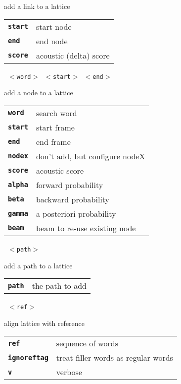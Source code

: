 \begin{description}
\begin{description}
        add a link to a lattice

      \begin{tabular}{ll}
 \texttt{\textbf{start}} &  start node  \\
 \texttt{\textbf{end}} &    end node  \\
 \texttt{\textbf{score}} &   acoustic (delta) score  \\
      \end{tabular}
       \texttt{ $<$word$>$ $<$start$>$ $<$end$>$      } \

        add a node to a lattice

      \begin{tabular}{ll}
 \texttt{\textbf{word}} &   search word \\
 \texttt{\textbf{start}} &  start frame  \\
 \texttt{\textbf{end}} &    end frame  \\
 \texttt{\textbf{nodex}} &   don't add, but configure nodeX  \\
 \texttt{\textbf{score}} &   acoustic score  \\
 \texttt{\textbf{alpha}} &   forward probability  \\
 \texttt{\textbf{beta}} &    backward probability  \\
 \texttt{\textbf{gamma}} &   a posteriori probability  \\
 \texttt{\textbf{beam}} &    beam to re-use existing node  \\
      \end{tabular}
       \texttt{ $<$path$>$} \

        add a path to a lattice

      \begin{tabular}{ll}
 \texttt{\textbf{path}} &  the path to add  \\
      \end{tabular}
       \texttt{ $<$ref$>$  } \

        align lattice with reference

      \begin{tabular}{ll}
 \texttt{\textbf{ref}} &        sequence of words  \\
 \texttt{\textbf{ignoreftag}} &  treat filler words as regular words  \\
 \texttt{\textbf{v}} &           verbose  \\
      \end{tabular}
       \texttt{} \


\end{description}
\end{description}
